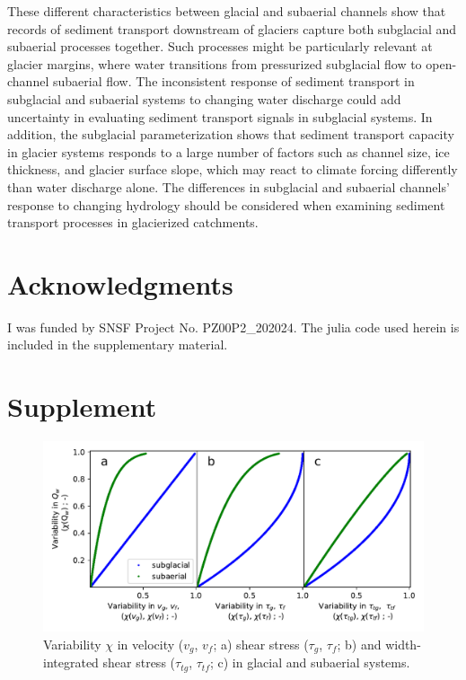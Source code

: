 \documentclass[11pt]{article}
\begin{document}
\begin{spacing}{1}
  These different characteristics between glacial and subaerial channels show that records of sediment transport downstream of glaciers capture both subglacial and subaerial processes together.
  Such processes might be particularly relevant at glacier margins, where water transitions from pressurized subglacial flow to open-channel subaerial flow.
  The inconsistent response of sediment transport in subglacial and subaerial systems to changing water discharge could add uncertainty in evaluating  sediment transport signals in subglacial systems.
  In addition, the subglacial parameterization shows that sediment transport capacity in glacier systems responds to a large number of factors such as channel size, ice thickness, and glacier surface slope, which may react to climate forcing differently than water discharge alone. 
  The differences in subglacial and subaerial channels' response to changing hydrology should be considered when examining sediment transport processes in glacierized catchments.
  
  \section{Acknowledgments}
  
  I was funded by SNSF Project No. PZ00P2\_202024.
  The julia code used herein is included in the supplementary material.
  
  
\end{spacing}





\section{Supplement}

\begin{center}
  \begin{figure}[H]
    \includegraphics[width=0.7\linewidth]{multi_run_vars.pdf}
    \caption{Variability $\chi$ in velocity ($v_g$, $v_f$; a) shear stress ($\tau_g$, $\tau_f$; b) and width-integrated shear stress ($\tau_{tg}$, $\tau_{tf}$; c)  in glacial and subaerial systems. }
    \label{fig:gammas}
  \end{figure}
\end{center}
\end{document}

